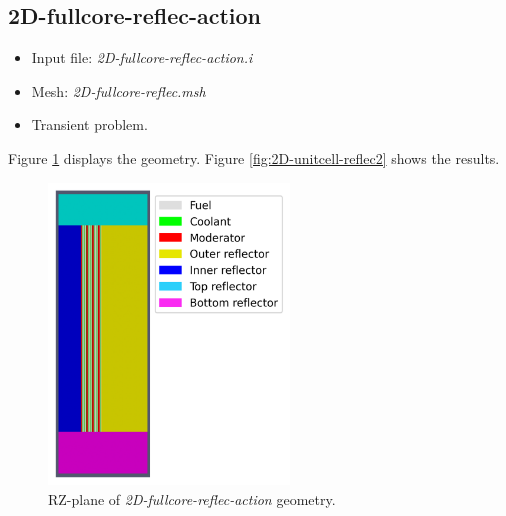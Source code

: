\documentclass[11pt,letterpaper]{article}
\begin{document}
\subsection{2D-fullcore-reflec-action}

	\begin{itemize}
		\item Input file: \textit{2D-fullcore-reflec-action.i}
		\item Mesh: \textit{2D-fullcore-reflec.msh}
		\item Transient problem.
	\end{itemize}

Figure \ref{fig:2D-fullcore-reflec} displays the geometry.
Figure \ref{fig:2D-unitcell-reflec2} shows the results.

	\begin{figure}[htbp!]
		\centering
		\includegraphics[height=8cm]{2D-fullcore-reflec-mesh}
		\caption{RZ-plane of \textit{2D-fullcore-reflec-action} geometry.}
		\label{fig:2D-fullcore-reflec}
	\end{figure}
\end{document}
